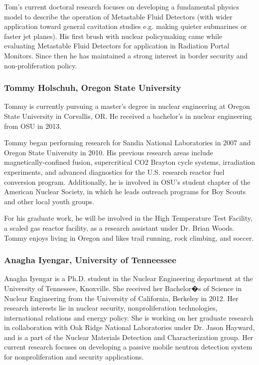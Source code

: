 Tom's current doctoral research focuses on developing a fundamental physics
model to describe the operation of Metastable Fluid Detectors (with wider
application toward general cavitation studies e.g. making quieter submarines or
faster jet planes). His first brush with nuclear policymaking came while
evaluating Metastable Fluid Detectors for application in Radiation Portal
Monitors. Since then he has maintained a strong interest in border security and
non-proliferation policy.

\subsubsection*{Tommy Holschuh, Oregon State University}

Tommy is currently pursuing a master's degree in nuclear engineering at Oregon
State University in Corvallis, OR. He received a bachelor's in nuclear
engineering from OSU in 2013.

Tommy began performing research for Sandia National Laboratories in 2007 and
Oregon State University in 2010. His previous research areas include
magnetically-confined fusion, supercritical CO2 Brayton cycle systems,
irradiation experiments, and advanced diagnostics for the U.S. research reactor
fuel conversion program. Additionally, he is involved in OSU's student chapter
of the American Nuclear Society, in which he leads outreach programs for Boy
Scouts and other local youth groups.

For his graduate work, he will be involved in the High Temperature Test
Facility, a scaled gas reactor facility, as a research assistant under Dr. Brian
Woods. Tommy enjoys living in Oregon and likes trail running, rock climbing, and
soccer.

\subsubsection*{Anagha Iyengar, University of Tenneessee}

Anagha Iyengar is a Ph.D. student in the Nuclear Engineering department at the
University of Tennessee, Knoxville. She received her Bachelor�s of Science in
Nuclear Engineering from the University of California, Berkeley in 2012. Her
research interests lie in nuclear security, nonproliferation technologies,
international relations and energy policy. She is working on her graduate
research in collaboration with Oak Ridge National Laboratories under Dr. Jason
Hayward, and is a part of the Nuclear Materials Detection and Characterization
group. Her current research focuses on developing a passive mobile neutron
detection system for nonproliferation and security applications.

